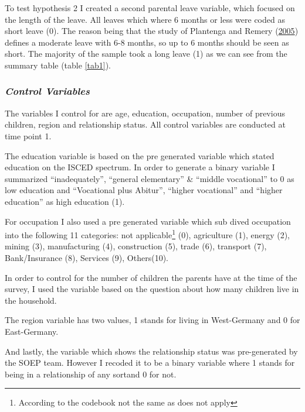 \documentclass[
  11pt,
]{article}
\begin{document}
To test hypothesis 2 I created a second parental leave variable, which focused on the length of the leave. All leaves which where 6 months or less were coded as short leave (0). The reason being that the study of Plantenga and Remery (\protect\hyperlink{ref-plantenga_reconciliation_2005}{2005}) defines a moderate leave with 6-8 months, so up to 6 months should be seen as short. The majority of the sample took a long leave (1) as we can see from the summary table (table \ref{tab1}).

\hypertarget{control-variables}{%
\subsubsection*{\texorpdfstring{\emph{Control Variables}}{Control Variables}}\label{control-variables}}

The variables I control for are age, education, occupation, number of previous children, region and relationship status. All control variables are conducted at time point 1.

The education variable is based on the pre generated variable which stated education on the ISCED spectrum. In order to generate a binary variable I summarized ``inadequately'', ``general elementary'' \& ``middle vocational'' to 0 as low education and ``Vocational plus Abitur'', ``higher vocational'' and ``higher education'' as high education (1).

For occupation I also used a pre generated variable which sub dived occupation into the following 11 categories: not applicable\footnote{According to the codebook not the same as does not apply} (0), agriculture (1), energy (2), mining (3), manufacturing (4), construction (5), trade (6), transport (7), Bank/Insurance (8), Services (9), Others(10).

In order to control for the number of children the parents have at the time of the survey, I used the variable based on the question about how many children live in the household.

The region variable has two values, 1 stands for living in West-Germany and 0 for East-Germany.

And lastly, the variable which shows the relationship status was pre-generated by the SOEP team. However I recoded it to be a binary variable where 1 stands for being in a relationship of any sortand 0 for not.
\end{document}
